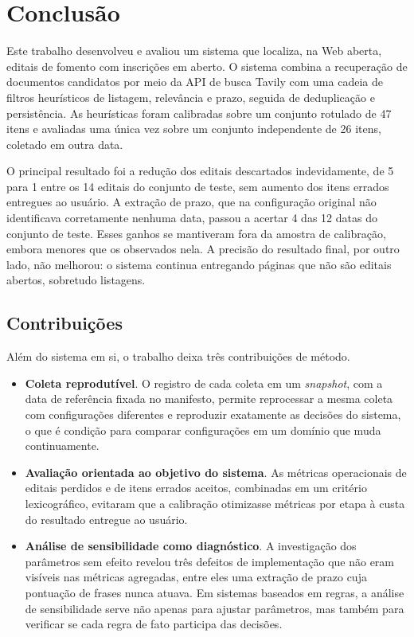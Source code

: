 \chapter[CONCLUSÃO]{Conclusão}
\label{cap:conclusao}

Este trabalho desenvolveu e avaliou um sistema que localiza, na Web aberta,
editais de fomento com inscrições em aberto. O sistema combina a recuperação
de documentos candidatos por meio da API de busca Tavily \cite{tavily} com uma
cadeia de filtros
heurísticos de listagem, relevância e prazo, seguida de deduplicação e
persistência. As heurísticas foram calibradas sobre um conjunto rotulado de 47
itens e avaliadas uma única vez sobre um conjunto independente de 26 itens,
coletado em outra data.

O principal resultado foi a redução dos editais descartados indevidamente, de
5 para 1 entre os 14 editais do conjunto de teste, sem aumento dos itens
errados entregues ao usuário. A extração de prazo, que na configuração original
não identificava corretamente nenhuma data, passou a acertar 4 das 12 datas do
conjunto de teste. Esses ganhos se mantiveram fora da amostra de calibração,
embora menores que os observados nela. A precisão do resultado final, por
outro lado, não melhorou: o sistema continua entregando páginas que não são
editais abertos, sobretudo listagens.

\section{Contribuições}
\label{sec:contribuicoes}

Além do sistema em si, o trabalho deixa três contribuições de método.

\begin{itemize}
  \item \textbf{Coleta reprodutível}. O registro de cada coleta em um
    \textit{snapshot}, com a data de referência fixada no manifesto, permite
    reprocessar a mesma coleta com configurações diferentes e reproduzir
    exatamente as decisões do sistema, o que é condição para comparar
    configurações em um domínio que muda continuamente.
  \item \textbf{Avaliação orientada ao objetivo do sistema}. As métricas
    operacionais de editais perdidos e de itens errados aceitos, combinadas
    em um critério lexicográfico, evitaram que a calibração otimizasse
    métricas por etapa à custa do resultado entregue ao usuário.
  \item \textbf{Análise de sensibilidade como diagnóstico}. A investigação dos
    parâmetros sem efeito revelou três defeitos de implementação que não eram
    visíveis nas métricas agregadas, entre eles uma extração de prazo cuja
    pontuação de frases nunca atuava. Em sistemas baseados em regras, a
    análise de sensibilidade serve não apenas para ajustar parâmetros, mas
    também para verificar se cada regra de fato participa das decisões.
\end{itemize}

